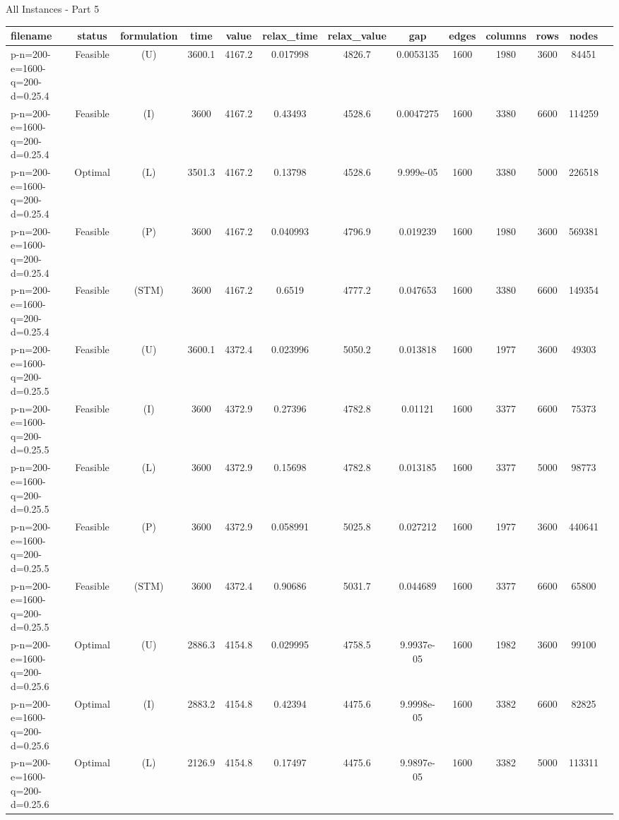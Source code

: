 \documentclass[landscape, a4paper]{article}
\newcommand{\STM}{\ensuremath{\mathrm{STM}}}
\newcommand{\Improved}{\ensuremath{\mathrm{I}}}
\newcommand{\Loose}{\ensuremath{\mathrm{L}}}
\newcommand{\Profit}{\ensuremath{\mathrm{P}}}
\newcommand{\Utility}{\ensuremath{\mathrm{U}}}
\begin{document}
\begin{center}
\newpage
All Instances - Part 5

\begin{tabular}{lcccccccccccc}
filename & status & formulation & time & value & relax\_time & relax\_value & gap & edges & columns & rows & nodes & \\
\hline
p-n=200-e=1600-q=200-d=0.25.4 & Feasible & (\Utility) & 3600.1 & 4167.2 & 0.017998 & 4826.7 & 0.0053135 & 1600 & 1980 & 3600 & 84451 & \\
p-n=200-e=1600-q=200-d=0.25.4 & Feasible & (\Improved) & 3600 & 4167.2 & 0.43493 & 4528.6 & 0.0047275 & 1600 & 3380 & 6600 & 114259 & \\
p-n=200-e=1600-q=200-d=0.25.4 & Optimal & (\Loose) & 3501.3 & 4167.2 & 0.13798 & 4528.6 & 9.999e-05 & 1600 & 3380 & 5000 & 226518 & \\
p-n=200-e=1600-q=200-d=0.25.4 & Feasible & (\Profit) & 3600 & 4167.2 & 0.040993 & 4796.9 & 0.019239 & 1600 & 1980 & 3600 & 569381 & \\
p-n=200-e=1600-q=200-d=0.25.4 & Feasible & (\STM) & 3600 & 4167.2 & 0.6519 & 4777.2 & 0.047653 & 1600 & 3380 & 6600 & 149354 & \\
p-n=200-e=1600-q=200-d=0.25.5 & Feasible & (\Utility) & 3600.1 & 4372.4 & 0.023996 & 5050.2 & 0.013818 & 1600 & 1977 & 3600 & 49303 & \\
p-n=200-e=1600-q=200-d=0.25.5 & Feasible & (\Improved) & 3600 & 4372.9 & 0.27396 & 4782.8 & 0.01121 & 1600 & 3377 & 6600 & 75373 & \\
p-n=200-e=1600-q=200-d=0.25.5 & Feasible & (\Loose) & 3600 & 4372.9 & 0.15698 & 4782.8 & 0.013185 & 1600 & 3377 & 5000 & 98773 & \\
p-n=200-e=1600-q=200-d=0.25.5 & Feasible & (\Profit) & 3600 & 4372.9 & 0.058991 & 5025.8 & 0.027212 & 1600 & 1977 & 3600 & 440641 & \\
p-n=200-e=1600-q=200-d=0.25.5 & Feasible & (\STM) & 3600 & 4372.4 & 0.90686 & 5031.7 & 0.044689 & 1600 & 3377 & 6600 & 65800 & \\
p-n=200-e=1600-q=200-d=0.25.6 & Optimal & (\Utility) & 2886.3 & 4154.8 & 0.029995 & 4758.5 & 9.9937e-05 & 1600 & 1982 & 3600 & 99100 & \\
p-n=200-e=1600-q=200-d=0.25.6 & Optimal & (\Improved) & 2883.2 & 4154.8 & 0.42394 & 4475.6 & 9.9998e-05 & 1600 & 3382 & 6600 & 82825 & \\
p-n=200-e=1600-q=200-d=0.25.6 & Optimal & (\Loose) & 2126.9 & 4154.8 & 0.17497 & 4475.6 & 9.9897e-05 & 1600 & 3382 & 5000 & 113311 & \\

\end{tabular}
\end{center}
\end{document}
